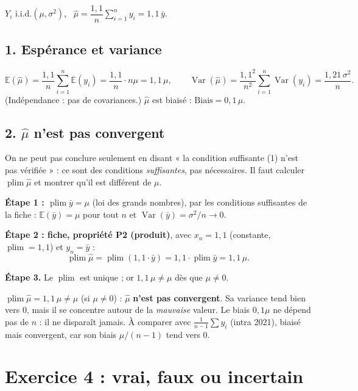 \documentclass[11pt,a4paper]{article}
\newcommand{\E}{\mathbb{E}}\newcommand{\Var}{\operatorname{Var}}\newcommand{\Cov}{\operatorname{Cov}}
\newcommand{\plim}{\operatorname{plim}}
\newcommand{\sumi}{\sum_{i=1}^{n}}
\begin{document}
$Y_i$ i.i.d.$(\mu,\sigma^2)$, \ $\hat\mu=\dfrac{1{,}1}{n}\sumi y_i=1{,}1\,\bar y$.

\subsection*{1. Espérance et variance}
\[
\E(\hat\mu)=\frac{1{,}1}{n}\sumi\E(y_i)=\frac{1{,}1}{n}\cdot n\mu=1{,}1\,\mu,
\qquad
\Var(\hat\mu)=\frac{1{,}1^2}{n^2}\sumi\Var(y_i)=\frac{1{,}21\,\sigma^2}{n}.
\]
(Indépendance : pas de covariances.) $\hat\mu$ est biaisé : $\text{Biais}=0{,}1\,\mu$.

\subsection*{2. $\hat\mu$ n'est pas convergent}

\begin{attention}
On ne peut pas conclure seulement en disant « la condition suffisante (1) n'est pas vérifiée » : ce sont des conditions \emph{suffisantes}, pas nécessaires. Il faut calculer $\plim\hat\mu$ et montrer qu'il est différent de $\mu$.
\end{attention}

\textbf{Étape 1 : $\plim\bar y=\mu$} (loi des grands nombres), par les conditions suffisantes de la fiche : $\E(\bar y)=\mu$ pour tout $n$ et $\Var(\bar y)=\sigma^2/n\to0$.

\textbf{Étape 2 : fiche, propriété P2 (produit)}, avec $x_n=1{,}1$ (constante, $\plim=1{,}1$) et $y_n=\bar y$ :
\[
\plim\hat\mu=\plim(1{,}1\cdot\bar y)=1{,}1\cdot\plim\bar y=1{,}1\,\mu .
\]

\textbf{Étape 3.} Le $\plim$ est unique ; or $1{,}1\,\mu\neq\mu$ dès que $\mu\neq0$.

\begin{reponse}
$\plim\hat\mu=1{,}1\,\mu\neq\mu$ (si $\mu\neq0$) : $\hat\mu$ \textbf{n'est pas convergent}. Sa variance tend bien vers 0, mais il se concentre autour de la \emph{mauvaise} valeur. Le biais $0{,}1\mu$ ne dépend pas de $n$ : il ne disparaît jamais. À comparer avec $\frac1{n-1}\sum y_i$ (intra 2021), biaisé mais convergent, car son biais $\mu/(n-1)$ tend vers 0.
\end{reponse}

\section{Exercice 4 : vrai, faux ou incertain}
\end{document}
